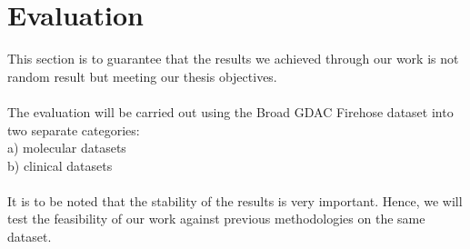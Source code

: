 %

\chapter{Evaluation}
This section is to guarantee that the results we achieved through our work is not random result but meeting our thesis objectives. \\~\\
The evaluation will be carried out using the Broad GDAC Firehose dataset into two separate categories\cite{https://doi.org/10.7908/c11g0km9}: \\
a) molecular datasets \\
b) clinical datasets \\~\\
It is to be noted that the stability of the results is very important. Hence, we will test the feasibility of our work  against previous methodologies on the same dataset.
